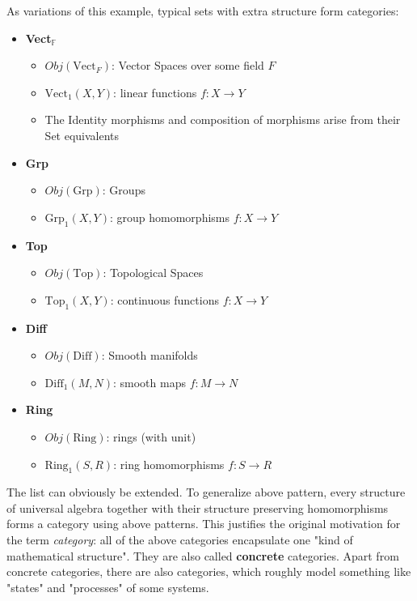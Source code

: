 \documentclass{article}
\theoremstyle{definition}
\begin{document}
As variations of this example, typical sets with extra structure form categories:
\begin{itemize}
    \item \textbf{Vect}$_{\mathbb{F}}$
    \begin{itemize}
        \item $Obj(\text{Vect}_F)$: Vector Spaces over some field $F$
        \item $\text{Vect}_1(X,Y)$: linear functions $f: X \rightarrow Y$
        \item The Identity morphisms and composition of morphisms arise from their Set equivalents
    \end{itemize}
    \item \textbf{Grp}
    \begin{itemize}
        \item $Obj(\text{Grp})$: Groups
        \item $\text{Grp}_1(X,Y)$: group homomorphisms $f: X \rightarrow Y$
    \end{itemize}
    \item \textbf{Top}
    \begin{itemize}
        \item $Obj(\text{Top})$: Topological Spaces
        \item $\text{Top}_1(X,Y)$: continuous functions $f: X \rightarrow Y$
    \end{itemize}
    \item \textbf{Diff}
    \begin{itemize}
        \item $Obj(\text{Diff})$: Smooth manifolds
        \item $\text{Diff}_1(M,N)$: smooth maps $f: M \rightarrow N$
    \end{itemize}
    \item \textbf{Ring}
    \begin{itemize}
        \item $Obj(\text{Ring})$: rings (with unit)
        \item $\text{Ring}_1(S, R)$: ring homomorphisms $f: S \rightarrow R$
    \end{itemize}
\end{itemize}

The list can obviously be extended. To generalize above pattern, every structure of universal algebra together with their structure preserving homomorphisms forms a category using above patterns.
This justifies the original motivation for the term \textit{category}: all of the above categories encapsulate one "kind of mathematical structure". They are also called \textbf{concrete} categories.
Apart from concrete categories, there are also categories, which roughly model something like "states" and "processes" of some systems.
\end{document}
